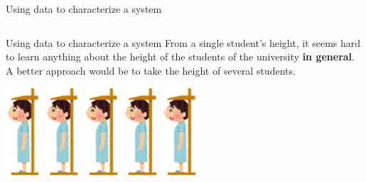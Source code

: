 \begin{frame}{Using data to characterize a system}
\begin{columns}
  \end{columns}
\end{frame}

\begin{frame}{Using data to characterize a system}
  From a single student's height, it seems hard to learn anything about
  the height of the students of the university {\bf in general}.
  A better approach would be to take the height of several students.\bigskip

  \begin{center}
    \includegraphics[width=0.1\textwidth]{../img/irasutoya_height}
    \includegraphics[width=0.1\textwidth]{../img/irasutoya_height}
    \includegraphics[width=0.1\textwidth]{../img/irasutoya_height}
    \includegraphics[width=0.1\textwidth]{../img/irasutoya_height}
    \includegraphics[width=0.1\textwidth]{../img/irasutoya_height}

\end{center}
\end{frame}
